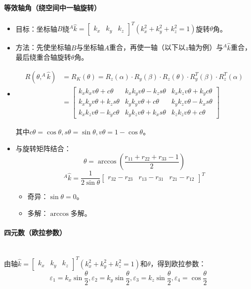 \documentclass[
12pt, %
a4paper, 
oneside, %
headinclude,footinclude, %
]{scrartcl}
\begin{document}
\paragraph{等效轴角（绕空间中一轴旋转）}
\begin{itemize}
\item 目标：坐标轴$ B $绕$ ^A \hat{k} = \begin{bmatrix} k_x & k_y & k_z \end{bmatrix}^T(k_x^2 + k_y^2 + k_z^2 = 1) $旋转$ \theta $角。
\item 方法：先使坐标轴$ B $与坐标轴$ A $重合，再使一轴（以下以$ z $轴为例）与$ ^A \hat{k} $重合，最后绕重合轴旋转$ \theta $角。
\item 
\begin{align*}
R(\theta, ^A \hat{k}) &= R_K(\theta) = R_z(\alpha) \cdot R_y(\beta) \cdot R_z(\theta) \cdot R_y^T(\beta) \cdot R_z^T(\alpha) \\
&= \begin{bmatrix} k_x k_x v\theta + c\theta & k_x k_y v\theta - k_z s\theta & k_x k_z v\theta + k_y c\theta \\ k_x k_y v\theta + k_z s\theta & k_y k_y v\theta + c\theta & k_y k_z v\theta - k_x s\theta \\ k_x k_z v\theta - k_y c\theta & k_y k_z v\theta + k_x s\theta & k_z k_z v\theta + c\theta \end{bmatrix} 
\end{align*}

其中$ c\theta = \cos\theta, s\theta = \sin\theta, v\theta = 1 - \cos\theta $。
\item 与旋转矩阵结合：
$$ \theta = \arccos(\frac{r_{11} + r_{22} + r_{33} - 1}{2}) $$
$$ ^A \hat{k} = \frac{1}{2 \sin θ} \begin{bmatrix} r_{32} - r_{23} & r_{13} - r_{31} & r_{21} - r_{12} \end{bmatrix}^T $$
\begin{itemize}
\item 奇异：$ \sin\theta = 0 $。
\item 多解：$ \arccos $多解。
\end{itemize}
\end{itemize}
\paragraph{四元数（欧拉参数）}~\\

由轴$ \hat{k} = \begin{bmatrix} k_x & k_y & k_z \end{bmatrix}^T(k_x^2 + k_y^2 + k_z^2 = 1) $和$ \theta $，得到欧拉参数：$$ \varepsilon_1 = k_x \sin\frac{\theta}{2}, \varepsilon_2 = k_y \sin\frac{\theta}{2}, \varepsilon_3 = k_z \sin\frac{\theta}{2}, \varepsilon_4 = \cos\frac{\theta}{2} $$
\end{document}
